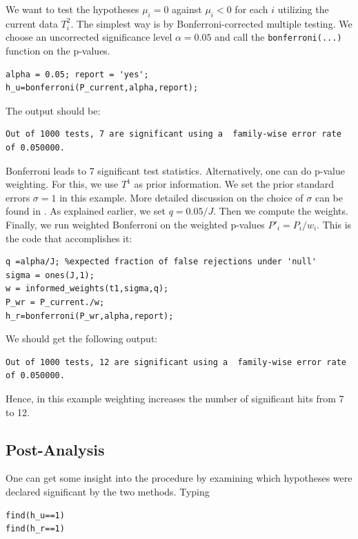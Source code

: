 \documentclass[english,11pt]{article} %
\begin{document}
We want to test the hypotheses $\mu_i = 0 $ against $\mu_i <0$ for each $i$ utilizing the current data $T^{2}_i$. The simplest way is by Bonferroni-corrected multiple testing. We choose an uncorrected significance level $\alpha=0.05$ and call the \verb+bonferroni(...)+ function on the p-values.

\begin{verbatim}
alpha = 0.05; report = 'yes';
h_u=bonferroni(P_current,alpha,report);
\end{verbatim}
The output should be:

\begin{verbatim}
Out of 1000 tests, 7 are significant using a  family-wise error rate  of 0.050000.
\end{verbatim}

Bonferroni leads to 7 significant test statistics. Alternatively, one can do p-value weighting. For this, we use $T^1$ as prior information. We set the prior standard errors $\sigma=1$ in this example. More detailed discussion on the choice of $\sigma$ can be found in \citep{dobriban2015optimal}. As explained earlier, we set $q  = 0.05/J$. Then we compute the weights. Finally, we run weighted Bonferroni on the weighted p-values $P'_i = P_i/w_i$. This is the code that accomplishes it:


\begin{verbatim}
q =alpha/J; %expected fraction of false rejections under 'null'
sigma = ones(J,1);
w = informed_weights(t1,sigma,q);
P_wr = P_current./w;
h_r=bonferroni(P_wr,alpha,report);
\end{verbatim}

We should get the following output:

\begin{verbatim}
Out of 1000 tests, 12 are significant using a  family-wise error rate  of 0.050000.
\end{verbatim}

Hence, in this example weighting increases the number of significant hits from 7 to 12.

\subsection{Post-Analysis}

One can get some insight into the procedure by examining which hypotheses were declared significant by the two methods. Typing

\begin{verbatim}
find(h_u==1)
find(h_r==1)
\end{verbatim}
\end{document}
